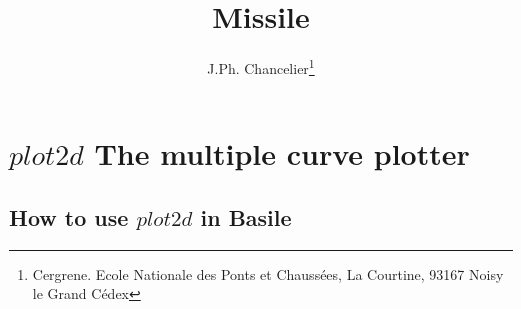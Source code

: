              \textheight=660pt 
             \textwidth=15cm
             \topmargin=-27pt 
             \oddsidemargin=0.7cm
             \evensidemargin=0.7cm
             \marginparwidth=60pt
             \title{Missile} 
             \author{J.Ph. Chancelier\thanks{Cergrene. Ecole Nationale des Ponts et Chauss\'ees, La Courtine,  93167 Noisy le Grand C\'{e}dex }}
	

\maketitle
\section{$plot2d$ The multiple curve plotter}
\subsection{How to use $plot2d$ in Basile}

